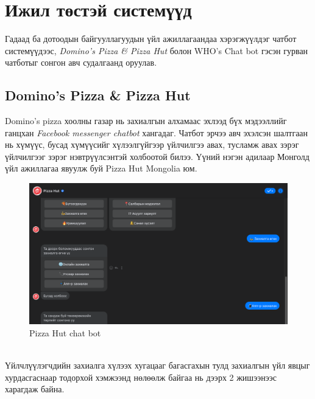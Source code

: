 \section{Ижил төстэй системүүд}
Гадаад ба дотоодын байгууллагуудын үйл ажиллагаандаа хэрэгжүүлдэг чатбот системүүдээс, \textit{Domino's Pizza \& Pizza Hut} болон {WHO's Chat bot} гэсэн гурван чатботыг сонгон авч судалгаанд оруулав. 
\subsection{Domino's Pizza \& Pizza Hut}
Domino's pizza хоолны газар нь захиалгын алхамаас эхлээд бүх мэдээллийг ганцхан \textit{Facebook messenger chatbot} хангадаг. Чатбот эрчээ авч эхэлсэн шалтгаан нь хүмүүс, бусад хүмүүсийг хүлээлгүйгээр үйлчилгээ авах, тусламж авах зэрэг үйлчилгээг зэрэг нэвтрүүлсэнтэй холбоотой билээ. Үүний нэгэн адилаар Монголд үйл ажиллагаа явуулж буй Pizza Hut Mongolia юм.
\begin{figure}[ht]
  \centering
  \includegraphics[width=\textwidth]{images/pizzaHut.png}
  \caption{Pizza Hut chat bot}
\end{figure}
\\Үйлчлүүлэгчдийн захиалга хүлээх хугацааг багасгахын тулд захиалгын үйл явцыг хурдасгаснаар тодорхой хэмжээнд нөлөөлж байгаа нь дээрх 2 жишээнээс харагдаж байна.

